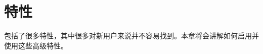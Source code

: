 
\ifchinese
\chapter{{\\}特性}\label{features}
\fi
\iffalse
\IfLanguageName{english}{
\chapter{Features}
\label{features}
}{}
\fi
{}
\ifchinese
\FlightGear{} 包括了很多特性，其中很多对新用户来说并不容易找到。本章将会讲解如何启用并使用这些高级特性。

